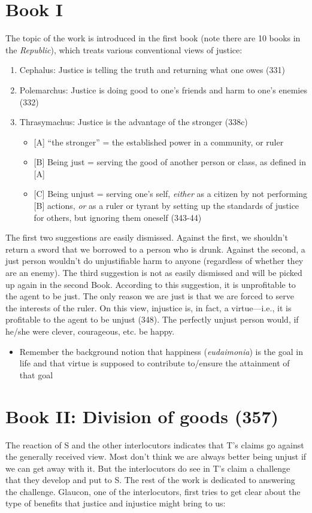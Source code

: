 \documentclass[oneside]{article}
\begin{document}
\section*{Book I}
The topic of the work is introduced in the first book (note there are 10 books in the \emph{Republic}), which treats various conventional views of justice:
\begin{enumerate}
\item Cephalus: Justice is telling the truth and returning what one owes (331)
\item Polemarchus: Justice is doing good to one's friends and harm to one's enemies (332)
\item Thrasymachus: Justice is the advantage of the stronger (338c)
\begin{itemize}
\item{[A] ``the stronger'' = the established power in a community, or ruler}
\item{[B] Being just = serving the good of another person or class, as defined in [A]}
\item{[C] Being unjust = serving one's self, \emph{either} as a citizen by not performing [B] actions, \emph{or} as a ruler or tyrant by setting up the standards of justice for others, but ignoring them oneself (343-44)}
\end{itemize}
\end{enumerate}
The first two suggestions are easily dismissed. Against the first, we shouldn't return a sword that we borrowed to a person who is drunk. Against the second, a just person wouldn't do unjustifiable harm to anyone (regardless of whether they are an enemy). The third suggestion is not as easily dismissed and will be picked up again in the second Book. According to this suggestion, it is unprofitable to the agent to be just. The only reason we are just is that we are forced to serve the interests of the ruler. On this view, injustice is, in fact, a virtue---i.e., it is profitable to the agent to be unjust (348). The perfectly unjust person would, if he/she were clever, courageous, etc. be happy. 

\begin{itemize}\item{Remember the background notion that happiness (\emph{eudaimonia}) is the goal in life and that virtue is supposed to contribute to/ensure the attainment of that goal}\end{itemize}

\section*{Book II: Division of goods (357)}
The reaction of S and the other interlocutors indicates that T's claims go against the generally received view. Most don't think we are always better being unjust if we can get away with it. But the interlocutors do see in T's claim a challenge that they develop and put to S. The rest of the work is dedicated to answering the challenge. Glaucon, one of the interlocutors, first tries to get clear about the type of benefits that justice and injustice might bring to us: 
\end{document}
